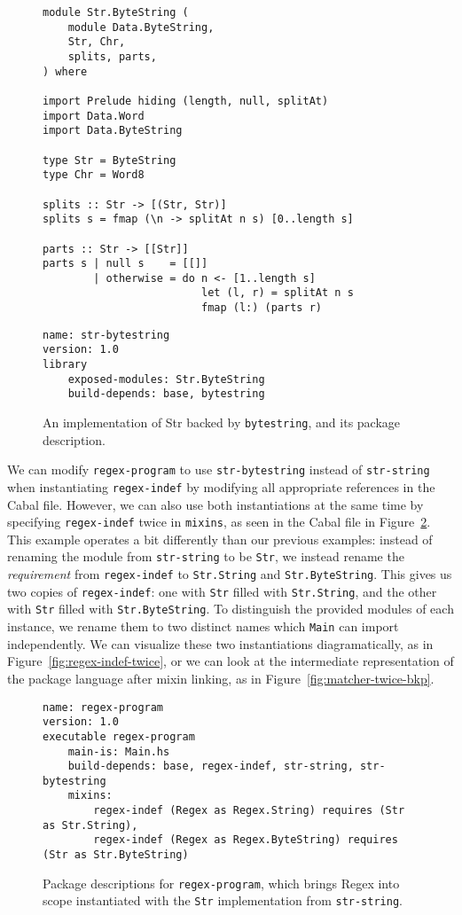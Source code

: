\begin{figure}
\begin{lstlisting}
module Str.ByteString (
    module Data.ByteString,
    Str, Chr,
    splits, parts,
) where

import Prelude hiding (length, null, splitAt)
import Data.Word
import Data.ByteString

type Str = ByteString
type Chr = Word8

splits :: Str -> [(Str, Str)]
splits s = fmap (\n -> splitAt n s) [0..length s]

parts :: Str -> [[Str]]
parts s | null s    = [[]]
        | otherwise = do n <- [1..length s]
                         let (l, r) = splitAt n s
                         fmap (l:) (parts r)
\end{lstlisting}
\begin{lstlisting}[language=Cabal]
name: str-bytestring
version: 1.0
library
    exposed-modules: Str.ByteString
    build-depends: base, bytestring
\end{lstlisting}
\caption{An implementation of Str backed by \texttt{bytestring},
and its package description.}
\label{fig:str-bytestring}
\end{figure}

We can modify \verb|regex-program| to use \verb|str-bytestring| instead
of \verb|str-string| when instantiating \verb|regex-indef| by modifying
all appropriate references in the Cabal file.  However, we can also use
both instantiations at the same time by specifying \verb|regex-indef|
twice in \verb|mixins|, as seen in the Cabal file in
Figure~\ref{fig:regex-program-multi}.
This example operates a bit differently than our previous examples:
instead of renaming the module from \verb|str-string| to be \verb|Str|,
we instead rename the \emph{requirement} from \verb|regex-indef| to
\verb|Str.String| and \verb|Str.ByteString|.  This gives us two copies
of \verb|regex-indef|: one with \verb|Str| filled with
\verb|Str.String|, and the other with \verb|Str| filled with
\verb|Str.ByteString|.  To distinguish the provided modules of each
instance, we rename them to two distinct names which \verb|Main|
can import independently.  We can visualize these two instantiations
diagramatically, as in Figure~\ref{fig:regex-indef-twice}, or
we can look at the intermediate representation of the package language
after mixin linking, as in Figure~\ref{fig:matcher-twice-bkp}.

\begin{figure}
\begin{lstlisting}[language=Cabal]
name: regex-program
version: 1.0
executable regex-program
    main-is: Main.hs
    build-depends: base, regex-indef, str-string, str-bytestring
    mixins:
        regex-indef (Regex as Regex.String) requires (Str as Str.String),
        regex-indef (Regex as Regex.ByteString) requires (Str as Str.ByteString)
\end{lstlisting}
\caption{Package descriptions for \texttt{regex-program}, which brings
Regex into scope instantiated with the \texttt{Str} implementation from \texttt{str-string}.}
\label{fig:regex-program-multi}
\end{figure}


